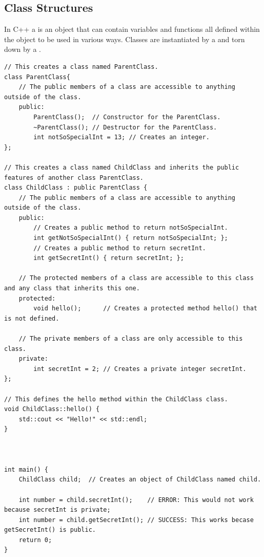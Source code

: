 \subsection{Class Structures}
In C++ a  is an object that can contain variables and functions all defined within the object to be used in various ways. Classes are instantiated by a  and torn down by a .
\begin{lstlisting}
// This creates a class named ParentClass.
class ParentClass{
	// The public members of a class are accessible to anything outside of the class.
	public:
		ParentClass();  // Constructor for the ParentClass.
		~ParentClass(); // Destructor for the ParentClass.
		int notSoSpecialInt = 13; // Creates an integer.
};

// This creates a class named ChildClass and inherits the public features of another class ParentClass.
class ChildClass : public ParentClass {
	// The public members of a class are accessible to anything outside of the class.
	public:
		// Creates a public method to return notSoSpecialInt.
		int getNotSoSpecialInt() { return notSoSpecialInt; }; 
		// Creates a public method to return secretInt.
		int getSecretInt() { return secretInt; };  
		
	// The protected members of a class are accessible to this class and any class that inherits this one.
	protected:
		void hello();      // Creates a protected method hello() that is not defined.
		
	// The private members of a class are only accessible to this class.
	private:
		int secretInt = 2; // Creates a private integer secretInt.
};

// This defines the hello method within the ChildClass class.
void ChildClass::hello() {
	std::cout << "Hello!" << std::endl;
}



int main() {
	ChildClass child;  // Creates an object of ChildClass named child.
	
	int number = child.secretInt();    // ERROR: This would not work because secretInt is private;
	int number = child.getSecretInt(); // SUCCESS: This works becase getSecretInt() is public.
	return 0;
}
\end{lstlisting}



















